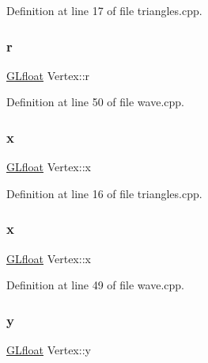 Definition at line 17 of file triangles.\+cpp.

\mbox{\label{struct_vertex_a0874a00d75d70c7b1e0b57a85297ee3b}} 
\subsubsection{\texorpdfstring{r}{r}\hspace{0.1cm}{\footnotesize\ttfamily [2/2]}}
{\footnotesize\ttfamily \mbox{\hyperlink{glad_8h_a836cf6377099e88abf24c255b5b0ac52}{G\+Lfloat}} Vertex\+::r}



Definition at line 50 of file wave.\+cpp.

\mbox{\label{struct_vertex_ae02cfb84a3e8f33a2a94a8d3b3798aac}} 
\subsubsection{\texorpdfstring{x}{x}\hspace{0.1cm}{\footnotesize\ttfamily [1/2]}}
{\footnotesize\ttfamily \mbox{\hyperlink{glad_8h_a836cf6377099e88abf24c255b5b0ac52}{G\+Lfloat}} Vertex\+::x}



Definition at line 16 of file triangles.\+cpp.

\mbox{\label{struct_vertex_ae02cfb84a3e8f33a2a94a8d3b3798aac}} 
\subsubsection{\texorpdfstring{x}{x}\hspace{0.1cm}{\footnotesize\ttfamily [2/2]}}
{\footnotesize\ttfamily \mbox{\hyperlink{glad_8h_a836cf6377099e88abf24c255b5b0ac52}{G\+Lfloat}} Vertex\+::x}



Definition at line 49 of file wave.\+cpp.

\mbox{\label{struct_vertex_a53f2719389e21b4e931282336d3817aa}} 
\subsubsection{\texorpdfstring{y}{y}\hspace{0.1cm}{\footnotesize\ttfamily [1/2]}}
{\footnotesize\ttfamily \mbox{\hyperlink{glad_8h_a836cf6377099e88abf24c255b5b0ac52}{G\+Lfloat}} Vertex\+::y}



